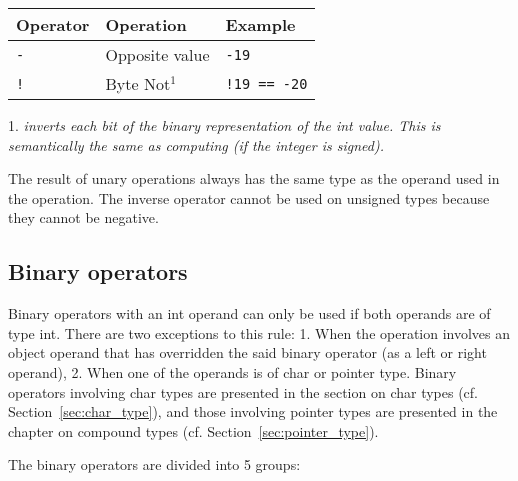 \begin{center}
  \vspace{-5pt}
  \begin{threeparttable}
    \begin{tabular}{|l|ll|}
      \hline
      Operator & Operation & Example\\[0pt]
      \hline
      \hline
      \texttt{-} & Opposite value & \texttt{-19}\\[0pt]
      \hline
      \texttt{!} & Byte Not\(^{1}\) & \texttt{!19 == -20}\\[0pt]
      \hline
    \end{tabular}
    \begin{tablenotes}

    \item[1.] \footnotesize \textit{inverts each bit of the binary
      representation of the int value. This is semantically the same as
      computing  (if the integer is signed).}

    \end{tablenotes}
  \end{threeparttable}
\end{center}

The result of unary operations always has the same type as the operand used in
the operation. The inverse operator \token{-} cannot be used on unsigned types
because they cannot be negative.

\subsection{Binary operators}
\label{sec:orgb91194f}

Binary operators with an int operand can only be used if both operands are of
type int. There are two exceptions to this rule: 1. When the operation involves
an object operand that has overridden the said binary operator (as a left or
right operand), 2. When one of the operands is of char or pointer type. Binary
operators involving char types are presented in the section on char types
(cf. Section~\ref{sec:char_type}), and those involving pointer types are presented in
the chapter on compound types (cf. Section~\ref{sec:pointer_type}).

The binary operators are divided into 5 groups:

